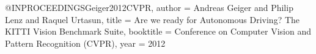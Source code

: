 @INPROCEEDINGS{Geiger2012CVPR,
  author = {Andreas Geiger and Philip Lenz and Raquel Urtasun},
  title = {Are we ready for Autonomous Driving? The KITTI Vision Benchmark Suite},
  booktitle = {Conference on Computer Vision and Pattern Recognition (CVPR)},
  year = {2012}
} 